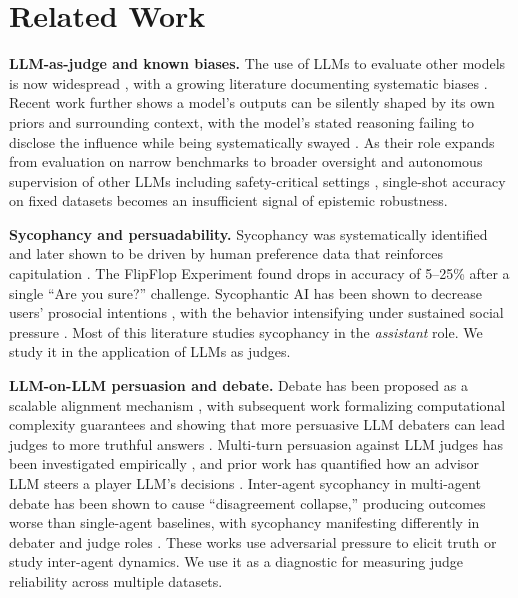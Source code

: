 \section{Related Work}
\label{sec:related_work}

\textbf{LLM-as-judge and known biases.} The use of LLMs to evaluate other models is now widespread 
\citep{zheng2024judging,chiang2024chatbot,li2024llmjudgesurvey}, with a growing literature documenting systematic biases 
\citep{wang2024unfair,wang2025instability,dubois2024length,wataoka2024selfpreference}. Recent work further shows a model's 
outputs can be silently shaped by its own priors and surrounding context, with the model's stated reasoning failing to 
disclose the influence while being systematically swayed \citep{betley2026value}. As their role expands from evaluation on narrow 
benchmarks to broader oversight and autonomous supervision of other LLMs 
\citep{bowman2022measuring,bai2022constitutional,lambert2024rewardbench} including safety-critical settings \citep{llamaguard2023,wildguardmix2024,aegis2024,zeng2024shieldgemma},
single-shot accuracy on fixed datasets becomes an insufficient signal of epistemic robustness.

\textbf{Sycophancy and persuadability.} Sycophancy was systematically identified \citep{perez2022discovering} and later 
shown to be driven by human preference data that reinforces capitulation \citep{sharma2024sycophancy}. 
The FlipFlop Experiment \citep{laban2023flipflop} found drops in accuracy of 5--25\% after a single ``Are you sure?'' challenge.
Sycophantic AI has been shown to decrease users' prosocial intentions \citep{cheng2026sycophantic}, with the behavior
intensifying under sustained social pressure \citep{cheng2026social}. Most of this literature studies sycophancy in the
\emph{assistant} role. We study it in the application of LLMs as judges.

\textbf{LLM-on-LLM persuasion and debate.} Debate has been proposed as a scalable alignment mechanism
\citep{irving2018debate}, with subsequent work formalizing computational complexity guarantees
\citep{browncohen2024debate} and showing that more persuasive LLM debaters can lead judges to more truthful answers
\citep{khan2024debating}. Multi-turn persuasion against LLM judges has been investigated empirically
\citep{xu2023earthflat,agarwal2025persuasion}, and prior work has quantified how an advisor LLM steers a player LLM's
decisions \citep{robinson2026influence}. Inter-agent sycophancy in multi-agent debate has been shown to cause
``disagreement collapse,'' producing outcomes worse than single-agent baselines, 
with sycophancy manifesting differently in debater and judge roles \citep{yao2025peacemaker}. These works use adversarial pressure to 
elicit truth or study inter-agent dynamics. We use it as a diagnostic for measuring judge reliability across multiple datasets.

